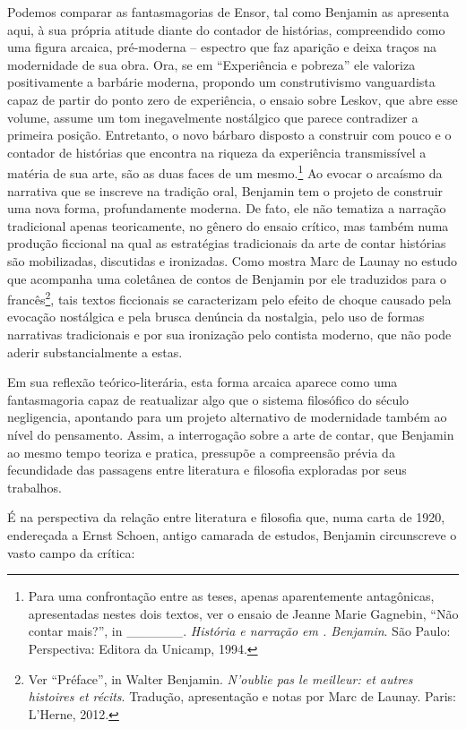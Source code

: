 Podemos comparar as fantasmagorias de Ensor, tal como Benjamin as
apresenta aqui, à sua própria atitude diante do contador de histórias,
compreendido como uma figura arcaica, pré-moderna -- espectro que faz
aparição e deixa traços na modernidade de sua obra. Ora, se em
``Experiência e pobreza'' ele valoriza positivamente a barbárie
moderna, propondo um construtivismo vanguardista capaz de partir do
ponto zero de experiência, o ensaio sobre Leskov, que abre esse volume,
assume um tom inegavelmente nostálgico que parece contradizer a primeira
posição. Entretanto, o novo bárbaro disposto a construir com pouco e o
contador de histórias que encontra na riqueza da experiência
transmissível a matéria de sua arte, são as duas faces de um
mesmo.\footnote{Para uma confrontação entre as teses, apenas
  aparentemente antagônicas, apresentadas nestes dois textos, ver o
  ensaio de Jeanne Marie Gagnebin, ``Não contar mais?'', in
  \_\_\_\_\_\_. \emph{História e narração em . Benjamin}. São Paulo:
  Perspectiva: Editora da Unicamp, 1994.} Ao evocar o arcaísmo da
narrativa que se inscreve na tradição oral, Benjamin tem o projeto de
construir uma nova forma, profundamente moderna. De fato, ele não
tematiza a narração tradicional apenas teoricamente, no gênero do ensaio
crítico, mas também numa produção ficcional na qual as estratégias
tradicionais da arte de contar histórias são mobilizadas, discutidas e
ironizadas. Como mostra Marc de Launay no estudo que acompanha uma
coletânea de contos de Benjamin por ele traduzidos para o
francês\footnote{Ver ``Préface'', in Walter Benjamin. \emph{N'oublie pas
  le meilleur: et autres histoires et récits}. Tradução, apresentação e
  notas por Marc de Launay. Paris: L'Herne, 2012.}, tais textos
ficcionais se caracterizam pelo efeito de choque causado pela evocação
nostálgica e pela brusca denúncia da nostalgia, pelo uso de formas
narrativas tradicionais e por sua ironização pelo contista moderno, que
não pode aderir substancialmente a estas.

Em sua reflexão teórico-literária, esta forma arcaica aparece como uma
fantasmagoria capaz de reatualizar algo que o sistema filosófico do
século~ negligencia, apontando para um projeto alternativo de
modernidade também ao nível do pensamento. Assim, a interrogação sobre a
arte de contar, que Benjamin ao mesmo tempo teoriza e pratica, pressupõe
a compreensão prévia da fecundidade das passagens entre literatura e
filosofia exploradas por seus trabalhos.

É na perspectiva da relação entre literatura e filosofia que, numa carta
de 1920, endereçada a Ernst Schoen, antigo camarada de estudos, Benjamin
circunscreve o vasto campo da crítica:

